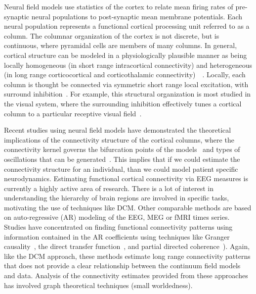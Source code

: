 \documentclass[onecolumn,draftcls]{IEEEtran}
\begin{document}
Neural field models use statistics of the cortex to relate mean firing rates of pre-synaptic neural populations to post-synaptic mean membrane potentials. Each neural population represents a functional cortical processing unit referred to as a column. The columnar organization of the cortex is not discrete, but is continuous, where pyramidal cells are members of many columns. In general, cortical structure can be modeled in a physiologically plausible manner as being locally homogeneous (in short range intracortical connectivity) and heterogeneous (in long range corticocortical and corticothalamic connectivity)~\cite{Jirsa2009}~\cite{Qubbaj2007}. Locally, each column is thought be connected via symmetric short range local excitation, with surround inhibition~\cite{Braitenberg1998}. For example, this structural organization is most studied in the visual system, where the surrounding inhibition effectively tunes a cortical column to a particular receptive visual field~\cite{Sullivan2006}.

Recent studies using neural field models have demonstrated the theoretical implications of the connectivity structure of the cortical columns, where the connectivity kernel governs the bifurcation points of the models~\cite{Hutt2005} and types of oscillations that can be generated~\cite{Schmidt2009}. This implies that if we could estimate the connectivity structure for an individual, than we could model patient specific neurodynamics. Estimating functional cortical connectivity via EEG measures is currently a highly active area of research. There is a lot of interest in understanding the hierarchy of brain regions are involved in specific tasks, motivating the use of techniques like DCM. Other comparable methods are based on auto-regressive (AR) modeling of the EEG, MEG or fMRI times series. Studies have concentrated on finding functional connectivity patterns using information contained in the AR coefficients using techniques like Granger causality~\cite{Hesse2003}, the direct transfer function~\cite{Kaminski1991}, and partial directed coherence~\cite{Sameshima1999}). Again, like the DCM approach, these methods estimate long range connectivity patterns that does not provide a clear relationship between the continuum field models and data. Analysis of the connectivity estimates provided from these approaches has involved graph theoretical techniques (small worldedness).
\end{document}

